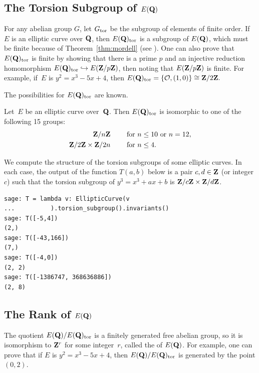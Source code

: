 \subsection{The Torsion Subgroup of $E(\mathbf{Q})$}
  For
any abelian group $G$, let $G_{\operatorname{tor}}$ be the subgroup of elements of
finite order.  If $E$ is an elliptic curve over $\mathbf{Q}$, then
$E(\mathbf{Q})_{\operatorname{tor}}$ is a subgroup of $E(\mathbf{Q})$, which must be finite because
of Theorem~\ref{thm:mordell} (see ).  One can
also prove that $E(\mathbf{Q})_{\operatorname{tor}}$ is finite by showing that there is a
prime $p$ and an injective reduction homomorphism $E(\mathbf{Q})_{\operatorname{tor}} \hookrightarrow
E(\mathbf{Z}/p\mathbf{Z})$, then noting that $E(\mathbf{Z}/p\mathbf{Z})$ is finite.  For example,
if~$E$ is $y^2= x^3-5x+4$, then $ E(\mathbf{Q})_{\operatorname{tor}} = \{\mathcal{O}, (1,0)\} \cong
\mathbf{Z}/2\mathbf{Z}{}.$

The possibilities for $E(\mathbf{Q})_{\operatorname{tor}}$ are known.
\begin{theorem}[Mazur, 1976]
Let~$E$ be an elliptic curve over~$\mathbf{Q}$.  Then $E(\mathbf{Q})_{\operatorname{tor}}$ is
isomorphic to one of the following 15 groups:
\begin{align*}
\mathbf{Z}/n\mathbf{Z}{} & \qquad\text{ for } n\leq 10 \text{ or } n=12,\\
\mathbf{Z}/2\mathbf{Z}\times \mathbf{Z}/2n &\qquad \text{ for } n \leq 4.
\end{align*}
\end{theorem}


\begin{sg}
We compute the structure of the torsion subgroups of some elliptic curves.
In each case, the output of the function $T(a,b)$ below is a pair $c,d \in \mathbf{Z}$
(or integer $c$)
such that the torsion subgroup of $y^3 = x^3 + ax + b$ is
$\mathbf{Z}/c\mathbf{Z} \times \mathbf{Z}/d\mathbf{Z}$.
\begin{verbatim}
sage: T = lambda v: EllipticCurve(v
...          ).torsion_subgroup().invariants()
sage: T([-5,4])
(2,)
sage: T([-43,166])
(7,)
sage: T([-4,0])
(2, 2)
sage: T([-1386747, 368636886])
(2, 8)
\end{verbatim}
\end{sg}


\subsection{The Rank of $E(\mathbf{Q})$}
The quotient $E(\mathbf{Q})/E(\mathbf{Q})_{\operatorname{tor}}$ is a finitely generated free abelian
group, so it is isomorphism to $\mathbf{Z}^r$ for some integer~$r$, called the
 of $E(\mathbf{Q})$.  For example, one can prove that if
$E$ is $y^2=x^3-5x+4$, then $E(\mathbf{Q})/E(\mathbf{Q})_{\operatorname{tor}}$ is generated by the
point $(0,2)$.

